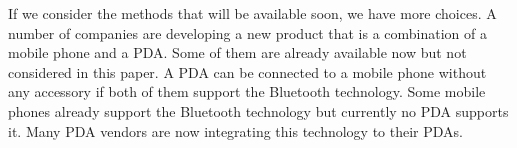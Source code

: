 If we consider the methods that will be available soon, we have 
more choices. A number of companies are developing a new product 
that is a combination of a mobile phone and a PDA. Some of them 
are already available now but not considered in this paper. A PDA 
can be connected to a mobile phone without any accessory if both 
of them support the Bluetooth technology. Some mobile phones 
already support the Bluetooth technology but currently no PDA 
supports it. Many PDA vendors are now integrating this technology 
to their PDAs.

